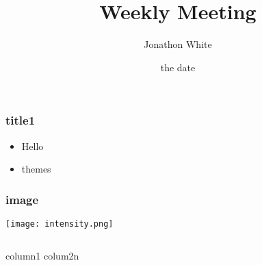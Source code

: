 \documentclass{beamer}
\title{Weekly Meeting}
\author{Jonathon White}
\date{the date}
\begin{document}
\maketitle

\begin{frame}
\frametitle{title1}
	\begin{itemize}
	\item Hello\pause
	\item themes
	\end{itemize}
\end{frame}

\begin{frame}
\frametitle{image}
\texttt{[image: intensity.png]}
\end{frame}

\begin{frame}
\begin{columns}
column1
colum2n
\end{columns}
\end{frame}
\end{document}
